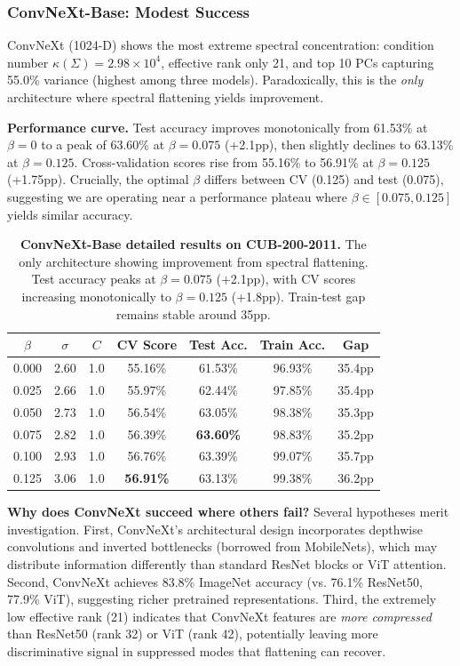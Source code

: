 \documentclass[11pt]{article}
\begin{document}
\subsubsection{ConvNeXt-Base: Modest Success}

ConvNeXt (1024-D) shows the most extreme spectral concentration: condition number $\kappa(\Sigma) = 2.98 \times 10^4$, effective rank only 21, and top 10 PCs capturing 55.0\% variance (highest among three models). Paradoxically, this is the \emph{only} architecture where spectral flattening yields improvement.

\textbf{Performance curve.} Test accuracy improves monotonically from 61.53\% at $\beta=0$ to a peak of 63.60\% at $\beta=0.075$ (+2.1pp), then slightly declines to 63.13\% at $\beta=0.125$. Cross-validation scores rise from 55.16\% to 56.91\% at $\beta=0.125$ (+1.75pp). Crucially, the optimal $\beta$ differs between CV (0.125) and test (0.075), suggesting we are operating near a performance plateau where $\beta \in [0.075, 0.125]$ yields similar accuracy.

\begin{table}[h]
\centering
\caption{\textbf{ConvNeXt-Base detailed results on CUB-200-2011.} The only architecture showing improvement from spectral flattening. Test accuracy peaks at $\beta=0.075$ (+2.1pp), with CV scores increasing monotonically to $\beta=0.125$ (+1.8pp). Train-test gap remains stable around 35pp.}
\label{tab:convnext_detail}
\begin{tabular}{ccccccc}
\toprule
$\beta$ & $\sigma$ & $C$ & CV Score & Test Acc. & Train Acc. & Gap \\
\midrule
0.000 & 2.60 & 1.0 & 55.16\% & 61.53\% & 96.93\% & 35.4pp \\
0.025 & 2.66 & 1.0 & 55.97\% & 62.44\% & 97.85\% & 35.4pp \\
0.050 & 2.73 & 1.0 & 56.54\% & 63.05\% & 98.38\% & 35.3pp \\
0.075 & 2.82 & 1.0 & 56.39\% & \textbf{63.60\%} & 98.83\% & 35.2pp \\
0.100 & 2.93 & 1.0 & 56.76\% & 63.39\% & 99.07\% & 35.7pp \\
0.125 & 3.06 & 1.0 & \textbf{56.91\%} & 63.13\% & 99.38\% & 36.2pp \\
\bottomrule
\end{tabular}
\end{table}

\textbf{Why does ConvNeXt succeed where others fail?} Several hypotheses merit investigation. First, ConvNeXt's architectural design incorporates depthwise convolutions and inverted bottlenecks (borrowed from MobileNets), which may distribute information differently than standard ResNet blocks or ViT attention. Second, ConvNeXt achieves 83.8\% ImageNet accuracy (vs. 76.1\% ResNet50, 77.9\% ViT), suggesting richer pretrained representations. Third, the extremely low effective rank (21) indicates that ConvNeXt features are \emph{more compressed} than ResNet50 (rank 32) or ViT (rank 42), potentially leaving more discriminative signal in suppressed modes that flattening can recover.
\end{document}
